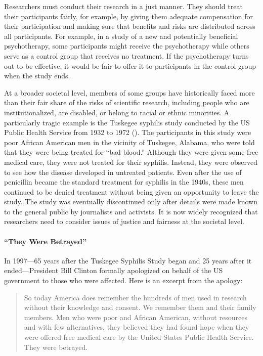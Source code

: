 \documentclass[
]{krantz}
\begin{document}
Researchers must conduct their research in a just manner. They should treat their participants fairly, for example, by giving them adequate compensation for their participation and making sure that benefits and risks are distributed across all participants. For example, in a study of a new and potentially beneficial psychotherapy, some participants might receive the psychotherapy while others serve as a control group that receives no treatment. If the psychotherapy turns out to be effective, it would be fair to offer it to participants in the control group when the study ends.

At a broader societal level, members of some groups have historically faced more than their fair share of the risks of scientific research, including people who are institutionalized, are disabled, or belong to racial or ethnic minorities. A particularly tragic example is the Tuskegee syphilis study conducted by the US Public Health Service from 1932 to 1972 (). The participants in this study were poor African American men in the vicinity of Tuskegee, Alabama, who were told that they were being treated for ``bad blood.'' Although they were given some free medical care, they were not treated for their syphilis. Instead, they were observed to see how the disease developed in untreated patients. Even after the use of penicillin became the standard treatment for syphilis in the 1940s, these men continued to be denied treatment without being given an opportunity to leave the study. The study was eventually discontinued only after details were made known to the general public by journalists and activists. It is now widely recognized that researchers need to consider issues of justice and fairness at the societal level.

\paragraph*{``They Were Betrayed''}\label{they-were-betrayed}

In 1997---65 years after the Tuskegee Syphilis Study began and 25 years after it ended---President Bill Clinton formally apologized on behalf of the US government to those who were affected. Here is an excerpt from the apology:

\begin{quote}
So today America does remember the hundreds of men used in research without their knowledge and consent. We remember them and their family members. Men who were poor and African American, without resources and with few alternatives, they believed they had found hope when they were offered free medical care by the United States Public Health Service. They were betrayed.
\end{quote}
\end{document}
